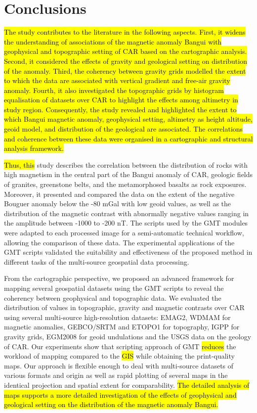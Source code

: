 \documentclass[minerals,article,submit,pdftex,moreauthors]{Definitions/mdpi}
\begin{document}
\section{Conclusions}

\hl{The study contributes to the literature in the following aspects. First, it widens the understanding of associations of the magnetic anomaly Bangui with geophysical and topographic setting of CAR based on the cartographic analysis. Second, it considered the effects of gravity and geological setting on distribution of the anomaly. Third, the coherency between gravity grids modelled the extent to which the data are associated with vertical gradient and free-air gravity anomaly. Fourth, it also investigated the topographic grids by histogram equalisation of datasets over CAR to highlight the effects among altimetry in study region. Consequently, the study revealed and highlighted the extent to which Bangui magnetic anomaly, geophysical setting, altimetry as height altitude, geoid model, and distribution of the geological are associated. The correlations and coherence between these data were organised in a cartographic and structural analysis framework. }

\hl{Thus, this} study describes the correlation between the distribution of rocks with high magnetism in the central part of the Bangui anomaly of CAR, geologic fields of granites, greenstone belts, and the metamorphosed basalts as rock exposures. Moreover, it presented and compared the data on the extent of the negative Bouguer anomaly below the -80 mGal with low geoid values, as well as the distribution of the magnetic contrast with abnormally negative values ranging in the amplitude between -1000 to -200 nT. The scripts used by the GMT modules were adapted to each processed image for a semi-automatic technical workflow, allowing the comparison of these data. The experimental applications of the GMT scripts validated the suitability and effectiveness of the proposed method in different tasks of the multi-source geospatial data processing.  

From the cartographic perspective, we proposed an advanced framework for mapping several geospatial datasets using the GMT scripts to reveal the coherency between geophysical and topographic data. We evaluated the distribution of values in topographic, gravity and magnetic contrasts over CAR using several multi-source high-resolution datasets: EMAG2, WDMAM for magnetic anomalies, GEBCO/SRTM and ETOPO1 for topography, IGPP for gravity grids, EGM2008 for geoid undulations and the USGS data on the geology of CAR. Our experiments show that scripting approach of GMT \hl{reduces} the workload of mapping compared to the \hl{GIS} while\hl{ }obtaining the print-quality maps. Our approach is flexible enough to deal with multi-source datasets of various formats and origin as well as rapid plotting of several maps in the identical projection and spatial extent for comparability. \hl{The detailed analysis of maps supports a more detailed investigation of the effects of geophysical and geological setting on the distribution of the magnetic anomaly Bangui.}
\end{document}
